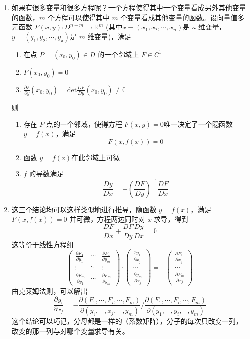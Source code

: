 \begin{enumerate}
    \item 如果有很多变量和很多方程呢？一个方程使得其中一个变量看成另外其他变量的函数，$m$ 个方程可以使得其中 $m$ 个变量看成其他变量的函数。设向量值多元函数 $F(x,y): D^{n+m} \to \mathbb{R} ^ {m}$ (其中$x=(x_1,x_2, \cdots, x_n)$是 $n$ 维变量， $y= (y_1,y_2,\cdots,y_n)$是 $m$ 维变量)，满足
    \begin{enumerate}[(1)]
        \item 在点 $P=(x_0 , y_0 ) \in D$ 的一个邻域上 $F \in C^1$
        \item $F(x_0, y_0) = 0$
        \item $ \frac{\partial F}{ \partial y}(x_0, y_0) = \mathrm{det} \frac{D F}{D y}(x_0, y_0) \neq 0$
    \end{enumerate}
    则
    \begin{enumerate}[(1)]
        \item 存在 $P$ 点的一个邻域，使得方程 $F(x,y)=0$唯一决定了一个隐函数 $y = f(x)$，满足 
        $$ F(x,f(x)) = 0 $$
        \item 函数 $y = f(x)$在此邻域上可微
        \item $f$ 的导数满足
        $$ \frac{D y}{ D x} = - \left( \frac{D F}{D y} \right)^{-1} \frac{D F}{D x}$$
    \end{enumerate}
    
    \item 这三个结论均可以这样类似地进行推导，隐函数 $y = f(x)$，满足 $F(x,f(x))=0$ 并可微，方程两边同时对 $x$ 求导，得到
    $$
    \frac{DF}{Dx}+\frac{DF}{Dy}\frac{Dy}{Dx}=0 
    $$
    这等价于线性方程组
    $$
    \left(\begin{array}{ccc}\frac{\partial F_1}{\partial y_1}&\cdots&\frac{\partial F_1}{\partial y_m}\\\vdots&\ddots&\vdots\\\frac{\partial F_m}{\partial y_1}&\cdots&\frac{\partial F_m}{\partial y_m}\end{array}\right)\cdot\left(\begin{array}{c}\frac{\partial y_1}{\partial x_j}\\\cdots\\\frac{\partial y_m}{\partial x_j}\end{array}\right)=-\left(\begin{array}{c}\frac{\partial F_1}{\partial x_j}\\\cdots\\\frac{\partial F_m}{\partial x_j}\end{array}\right)
    $$
    由克莱姆法则，可以解出
    $$
    \frac{\partial y_i}{\partial x_j}=-\frac{\partial(F_1,\cdots,F_i,\cdots,F_m)}{\partial(y_1,\cdots,x_j,\cdots,y_m)}/\frac{\partial(F_1,\cdots,F_i,\cdots,F_m)}{\partial(y_1,\cdots,y_i,\cdots,y_m)}
    $$
    这个结论可以巧记，分母都是一样的（系数矩阵），分子的每次只改变一列，改变的那一列与对哪个变量求导有关。


\end{enumerate}
